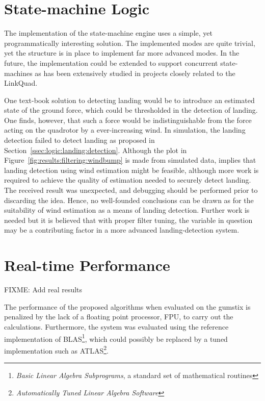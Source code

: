     \section{State-machine Logic}
        The implementation of the state-machine engine uses a simple, yet
        programmatically interesting solution. The implemented modes
        are quite trivial, yet the structure is in place to implement
        far more advanced modes. In the future, the implementation could
        be extended to support concurrent state-machines as has been
        extensively studied in projects closely related to the LinkQuad.

        One text-book solution to detecting landing would be to introduce
        an estimated state of the ground force, which could be thresholded
        in the detection of landing. One finds, however,
        that such a force would be indistinguishable from
        the force acting on the quadrotor by a ever-increasing wind.
        In simulation, the landing detection failed to detect landing
        as proposed in Section~\ref{ssec:logic:landing:detection}.
        Although the plot in Figure~\ref{fig:results:filtering:windbump}
        is made from simulated data, implies that landing detection
        using wind estimation might be feasible, although more work is required
        to achieve the quality of estimation needed to securely detect landing.
        The received result was unexpected, and debugging should be performed prior
        to discarding the idea.
        Hence, no well-founded conclusions can be drawn as for the suitability
        of wind estimation as a means of landing detection. Further work
        is needed but it is believed that with proper filter tuning, the
        variable in question may be a contributing factor in a more advanced
        landing-detection system.

    \section{Real-time Performance}
        FIXME: Add real results

        The performance of the proposed algorithms when evaluated on the
        gumstix is penalized by the lack of a floating point processor, FPU, to
        carry out the calculations. Furthermore, the system was evaluated
        using the reference implementation of BLAS\footnote{\textit{Basic Linear Algebra Subprograms}, a standard set of mathematical routines},
        which could possibly be replaced by a tuned implementation such
        as ATLAS\footnote{\textit{Automatically Tuned Linear Algebra Software}}.
